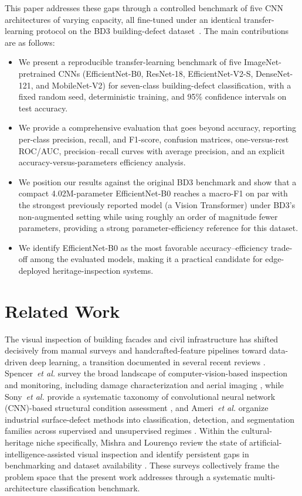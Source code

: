 \documentclass[conference]{IEEEtran}
\begin{document}
This paper addresses these gaps through a controlled benchmark of five CNN architectures of varying capacity, all fine-tuned under an identical transfer-learning protocol on the BD3 building-defect dataset~\cite{ref40}. The main contributions are as follows:
\begin{itemize}
\item We present a reproducible transfer-learning benchmark of five ImageNet-pretrained CNNs (EfficientNet-B0, ResNet-18, EfficientNet-V2-S, DenseNet-121, and MobileNet-V2) for seven-class building-defect classification, with a fixed random seed, deterministic training, and 95\% confidence intervals on test accuracy.

\item We provide a comprehensive evaluation that goes beyond accuracy, reporting per-class precision, recall, and F1-score, confusion matrices, one-versus-rest ROC/AUC, precision--recall curves with average precision, and an explicit accuracy-versus-parameters efficiency analysis.

\item We position our results against the original BD3 benchmark and show that a compact 4.02M-parameter EfficientNet-B0 reaches a macro-F1 on par with the strongest previously reported model (a Vision Transformer) under BD3's non-augmented setting while using roughly an order of magnitude fewer parameters, providing a strong parameter-efficiency reference for this dataset.

\item We identify EfficientNet-B0 as the most favorable accuracy--efficiency trade-off among the evaluated models, making it a practical candidate for edge-deployed heritage-inspection systems.
\end{itemize}
\section{Related Work}

The visual inspection of building facades and civil infrastructure has shifted decisively from manual surveys and handcrafted-feature pipelines toward data-driven deep learning, a transition documented in several recent reviews \cite{ref1,ref2,ref3,ref4}. Spencer~\textit{et al.} survey the broad landscape of computer-vision-based inspection and monitoring, including damage characterization and aerial imaging \cite{ref2}, while Sony~\textit{et al.} provide a systematic taxonomy of convolutional neural network (CNN)-based structural condition assessment \cite{ref3}, and Ameri~\textit{et al.} organize industrial surface-defect methods into classification, detection, and segmentation families across supervised and unsupervised regimes \cite{ref4}. Within the cultural-heritage niche specifically, Mishra and Lourenço review the state of artificial-intelligence-assisted visual inspection and identify persistent gaps in benchmarking and dataset availability \cite{ref1}. These surveys collectively frame the problem space that the present work addresses through a systematic multi-architecture classification benchmark.
\end{document}

